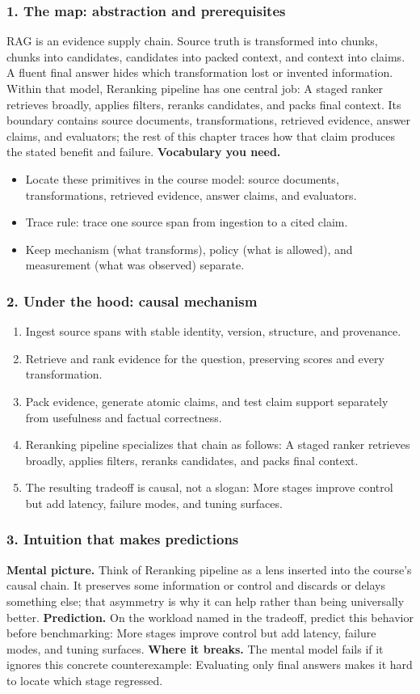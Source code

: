 \subsubsection*{1. The map: abstraction and prerequisites}
RAG is an evidence supply chain. Source truth is transformed into chunks, chunks into candidates, candidates into packed context, and context into claims. A fluent final answer hides which transformation lost or invented information.
Within that model, Reranking pipeline has one central job: A staged ranker retrieves broadly, applies filters, reranks candidates, and packs final context. Its boundary contains source documents, transformations, retrieved evidence, answer claims, and evaluators; the rest of this chapter traces how that claim produces the stated benefit and failure.
\textbf{Vocabulary you need.}\begin{itemize}
\item Locate these primitives in the course model: source documents, transformations, retrieved evidence, answer claims, and evaluators.
\item Trace rule: trace one source span from ingestion to a cited claim.
\item Keep mechanism (what transforms), policy (what is allowed), and measurement (what was observed) separate.
\end{itemize}
\subsubsection*{2. Under the hood: causal mechanism}\begin{enumerate}
\item Ingest source spans with stable identity, version, structure, and provenance.
\item Retrieve and rank evidence for the question, preserving scores and every transformation.
\item Pack evidence, generate atomic claims, and test claim support separately from usefulness and factual correctness.
\item Reranking pipeline specializes that chain as follows: A staged ranker retrieves broadly, applies filters, reranks candidates, and packs final context.
\item The resulting tradeoff is causal, not a slogan: More stages improve control but add latency, failure modes, and tuning surfaces.
\end{enumerate}
\subsubsection*{3. Intuition that makes predictions}
\textbf{Mental picture.} Think of Reranking pipeline as a lens inserted into the course's causal chain. It preserves some information or control and discards or delays something else; that asymmetry is why it can help rather than being universally better.
\textbf{Prediction.} On the workload named in the tradeoff, predict this behavior before benchmarking: More stages improve control but add latency, failure modes, and tuning surfaces.
\textbf{Where it breaks.} The mental model fails if it ignores this concrete counterexample: Evaluating only final answers makes it hard to locate which stage regressed.

